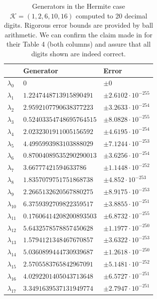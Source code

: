 \documentclass[a4paper,10pt]{article}
\begin{document}
\begin{appendix}
\begin{table}[h]
  \centering
  \begin{tabular}{|l|ll|}
  \hline
  {}             & Generator                & Error \\
  \hline
  $\lambda_{0}$  & $0$                      & $\pm 0$ \\
  $\lambda_{1}$  & $1.2247448713915890491$  & $\pm 2.6102 \cdot 10^{-255}$ \\
  $\lambda_{2}$  & $2.9592107790638377223$  & $\pm 3.2633 \cdot 10^{-254}$ \\
  $\lambda_{3}$  & $0.52403354748695764515$ & $\pm 8.0828 \cdot 10^{-255}$ \\
  $\lambda_{4}$  & $2.0232301911005156592$  & $\pm 4.6195 \cdot 10^{-254}$ \\
  $\lambda_{5}$  & $4.4995993983103888029$  & $\pm 7.1244 \cdot 10^{-253}$ \\
  $\lambda_{6}$  & $0.87004089535290290013$ & $\pm 3.6256 \cdot 10^{-254}$ \\
  $\lambda_{7}$  & $3.66777421594633786$    & $\pm 1.1448 \cdot 10^{-252}$ \\
  $\lambda_{8}$  & $1.8357079751751868738$  & $\pm 4.852 \cdot 10^{-253}$ \\
  $\lambda_{9}$  & $2.2665132620567880275$  & $\pm 8.9175 \cdot 10^{-253}$ \\
  $\lambda_{10}$ & $6.3759392709822359517$  & $\pm 3.8855 \cdot 10^{-251}$ \\
  $\lambda_{11}$ & $0.17606414208200893503$ & $\pm 6.8732 \cdot 10^{-255}$ \\
  $\lambda_{12}$ & $5.6432578578857450628$  & $\pm 1.1977 \cdot 10^{-250}$ \\
  $\lambda_{13}$ & $1.5794121348467670857$  & $\pm 3.6322 \cdot 10^{-253}$ \\
  $\lambda_{14}$ & $5.0360899444730939687$  & $\pm 1.2618 \cdot 10^{-250}$ \\
  $\lambda_{15}$ & $2.5705583765842967091$  & $\pm 5.1481 \cdot 10^{-252}$ \\
  $\lambda_{16}$ & $4.0292201405043713648$  & $\pm 6.5727 \cdot 10^{-251}$ \\
  $\lambda_{17}$ & $3.3491639537131949774$  & $\pm 2.7947 \cdot 10^{-251}$ \\
  \hline
  \end{tabular}
  \caption{Generators in the Hermite case $\mathcal{K} = (1, 2, 6, 10, 16)$
  computed to 20 decimal digits. Rigorous error bounds are provided by ball
  arithmetic. We can confirm the claim made in \cite{genz_keister} for their
  Table 4 (both columns) and assure that all digits shown are indeed correct.}
\end{table}


\end{appendix}
\end{document}

